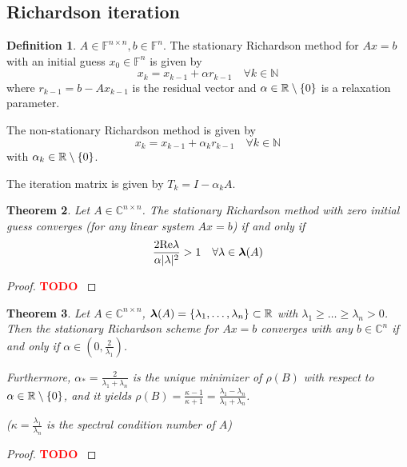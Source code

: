 \documentclass[12pt]{article}
\newcounter{lecture}
\newtheorem{theorem}{Theorem}[lecture]
\theoremstyle{definition}
\newtheorem{definition}[theorem]{Definition}
\theoremstyle{remark}
\numberwithin{equation}{section}
\newcommand{\F}{\mathbb{F}}
\newcommand{\R}{\mathbb{R}}
\newcommand{\C}{\mathbb{C}}
\newcommand{\N}{\mathbb{N}}
\renewcommand{\Re}{\textnormal{Re}}
\newcommand{\spectrum}[1]{\bm{\lambda}(#1)}
\newcommand{\TODO}[1][]{\textcolor{red}{\textbf{TODO\ifblank{#1}{}{:\ }#1} }}
\DeclarePairedDelimiter{\set}{\{}{\}}
\begin{document}
\subsection{Richardson iteration}
\begin{definition}
  $A \in \F^{n\times n}, b \in \F^n$. The stationary Richardson method for $Ax=b$ with an initial guess $x_0 \in \F^n$ is given by
  \begin{equation*}
    x_k = x_{k-1} + \alpha r_{k-1} \quad \forall k \in \N
  \end{equation*}
  where $r_{k-1} = b - Ax_{k-1}$ is the residual vector and $\alpha \in \R\setminus\set{0}$ is a relaxation parameter.

  The non-stationary Richardson method is given by
  \begin{equation*}
    x_k = x_{k-1} + \alpha_k r_{k-1} \quad \forall k \in \N
  \end{equation*}
  with $\alpha_k \in \R\setminus\set{0}$.

  The iteration matrix is given by $T_k = I - \alpha_k A$.
\end{definition}
\begin{theorem}
  Let $A \in \C^{n\times n}$. The stationary Richardson method with zero initial guess converges (for any linear system $Ax = b$) if and only if
  \begin{equation*}
    \frac{2 \Re \lambda}{\alpha |\lambda|^2} > 1 \quad \forall \lambda \in \spectrum{A}
  \end{equation*}
\end{theorem}
\begin{proof}
  \TODO
\end{proof}

\begin{theorem}
  Let $A \in \C^{n\times n}$, $\spectrum{A} = \set{\lambda_1,\ldots,\lambda_n} \subset \R$ with $\lambda_1 \geq \ldots \geq \lambda_n > 0$. Then the stationary Richardson scheme for $Ax = b$ converges with any $b \in \C^n$ if and only if $\alpha \in (0, \frac{2}{\lambda_1})$.

  Furthermore, $\alpha_* = \frac{2}{\lambda_1+\lambda_n}$ is the unique minimizer of $\rho(B)$ with respect to $\alpha \in \R\setminus\set{0}$, and it yields $\rho(B) = \frac{\kappa - 1}{\kappa + 1} = \frac{\lambda_1 - \lambda_n}{\lambda_1 + \lambda_n}$.

  ($\kappa = \frac{\lambda_1}{\lambda_n}$ is the spectral condition number of $A$)
\end{theorem}
\begin{proof}
  \TODO
\end{proof}
\end{document}
